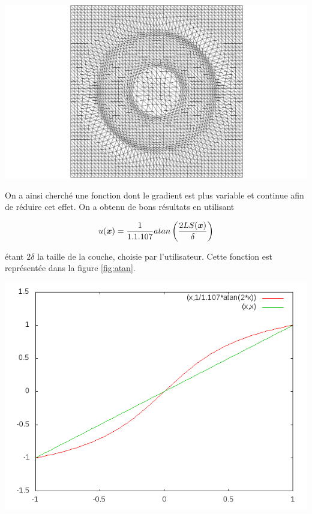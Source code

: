 \begingroup
  \centering
  \includegraphics[clip=true, trim = 10cm 0 10cm 0, scale=.22]{Bordeaux/figures/LSlin.png}
\endgroup

\indent

\indent On a ainsi cherché une fonction dont le gradient est plus variable et continue afin de réduire cet effet. On a obtenu de bons résultats en utilisant

\begin{equation}
	\label{eq:atan}
	u(\boldsymbol{x}) = \frac{1}{1.1.107} atan \left(\frac{2LS(\boldsymbol{x})}{\delta} \right)
\end{equation}

\noindent étant \(2\delta\) la taille de la couche, choisie par l'utilisateur. Cette fonction est représentée dans la figure \ref{fig:atan}.

\indent

\begingroup
  \centering
  \includegraphics[scale=.4]{Bordeaux/figures/atan.png}
\endgroup

